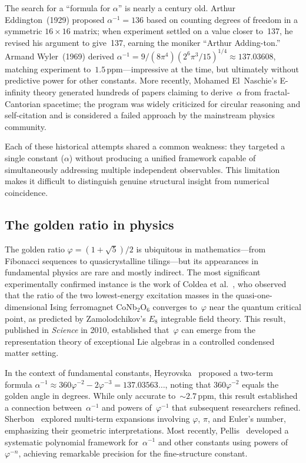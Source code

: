 \documentclass[11pt,a4paper]{article}
\newcommand{\vp}{\varphi}
\newcommand{\ppm}{\,\mathrm{ppm}}
\begin{document}
The search for a ``formula for $\alpha$'' is nearly a century old. Arthur
Eddington~(1929) proposed $\alpha^{-1}=136$ based on counting degrees of
freedom in a symmetric $16\times 16$ matrix; when experiment settled on a value
closer to~137, he revised his argument to give~137, earning the moniker
``Arthur Adding-ton.'' Armand Wyler~(1969) derived
$\alpha^{-1}=9/(8\pi^{4})(2^{6}\pi^{3}/15)^{1/4}\approx 137.03608$, matching
experiment to~$1.5\ppm$---impressive at the time, but ultimately without
predictive power for other constants. More recently, Mohamed El~Naschie's
E-infinity theory generated hundreds of papers claiming to derive~$\alpha$
from fractal-Cantorian spacetime; the program was widely criticized for
circular reasoning and self-citation and is considered a failed approach by the
mainstream physics community.

Each of these historical attempts shared a common weakness: they targeted a
single constant ($\alpha$) without producing a unified framework capable of
simultaneously addressing multiple independent observables. This limitation
makes it difficult to distinguish genuine structural insight from numerical
coincidence.

\subsection*{The golden ratio in physics}

The golden ratio $\vp=(1+\sqrt{5})/2$ is ubiquitous in mathematics---from
Fibonacci sequences to quasicrystalline tilings---but its appearances in
fundamental physics are rare and mostly indirect. The most significant
experimentally confirmed instance is the work of Coldea et
al.~\cite{coldea2010}, who observed that the ratio of the two lowest-energy
excitation masses in the quasi-one-dimensional Ising ferromagnet
CoNb$_{2}$O$_{6}$ converges to~$\vp$ near the quantum critical point, as
predicted by Zamolodchikov's $E_{8}$ integrable field theory. This result,
published in \emph{Science} in 2010, established that~$\vp$ can emerge from the
representation theory of exceptional Lie algebras in a controlled condensed
matter setting.

In the context of fundamental constants, Heyrovska~\cite{heyrovska2005}
proposed a two-term formula $\alpha^{-1}\approx 360\vp^{-2}-2\vp^{-3} =
137.03563\ldots$, noting that $360\vp^{-2}$ equals the golden angle in degrees.
While only accurate to~$\sim 2.7\ppm$, this result established a connection
between~$\alpha^{-1}$ and powers of~$\vp^{-1}$ that subsequent researchers
refined. Sherbon~\cite{sherbon2018} explored multi-term expansions involving
$\vp$, $\pi$, and Euler's number, emphasizing their geometric
interpretations. Most recently, Pellis~\cite{pellis2021alpha,pellis2023toe}
developed a systematic polynomial framework for~$\alpha^{-1}$ and other
constants using powers of~$\vp^{-n}$, achieving remarkable precision for the
fine-structure constant.
\end{document}
